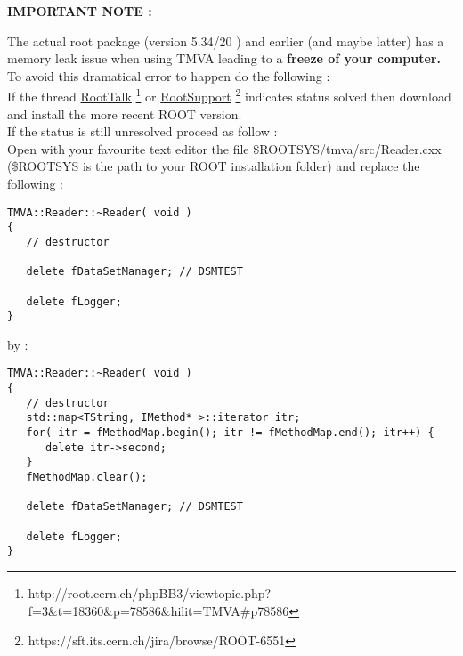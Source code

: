\begin{large}
\begin{center}
\textbf{IMPORTANT NOTE : } \\
\end{center}

\end{large} 
The actual root package (version 5.34/20 ) and earlier (and maybe latter) has a memory leak issue when using TMVA leading to a \textbf{freeze of your computer.}
To avoid this dramatical error to happen do the following : \\
If the thread 
\href{http://root.cern.ch/phpBB3/viewtopic.php?f=3&t=18360&p=78586&hilit=TMVA#p78586}{RootTalk}
\footnote{http://root.cern.ch/phpBB3/viewtopic.php?f=3\&t=18360\&p=78586\&hilit=TMVA\#p78586} 
or \href{https://sft.its.cern.ch/jira/browse/ROOT-6551}{RootSupport} \footnote{https://sft.its.cern.ch/jira/browse/ROOT-6551}
indicates status solved then download and install  the more recent ROOT version.\\
If the status is still unresolved proceed as follow : \\
Open with your favourite text editor the file  \$ROOTSYS/tmva/src/Reader.cxx (\$ROOTSYS is the path to your ROOT installation folder) and replace the following :\\

\begin{center}
\begin{minipage}{\textwidth}
\begin{lstlisting}
TMVA::Reader::~Reader( void )
{
   // destructor

   delete fDataSetManager; // DSMTEST

   delete fLogger;
}
\end{lstlisting}
\end{minipage}
\end{center}

by :\\
\begin{center}
\begin{minipage}{\textwidth}
\begin{lstlisting}
TMVA::Reader::~Reader( void )
{
   // destructor
   std::map<TString, IMethod* >::iterator itr;
   for( itr = fMethodMap.begin(); itr != fMethodMap.end(); itr++) {
      delete itr->second;
   }
   fMethodMap.clear();

   delete fDataSetManager; // DSMTEST

   delete fLogger;
}
\end{lstlisting}
\end{minipage}
\end{center}

